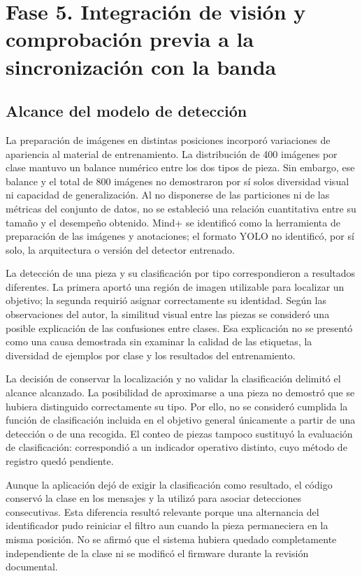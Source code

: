 \section{Fase 5. Integración de visión y comprobación previa a la sincronización con la banda}
\label{sec:discusion_fase5}

\subsection{Alcance del modelo de detección}

La preparación de imágenes en distintas posiciones incorporó variaciones de apariencia al material de entrenamiento. La distribución de 400 imágenes por clase mantuvo un balance numérico entre los dos tipos de pieza. Sin embargo, ese balance y el total de 800 imágenes no demostraron por sí solos diversidad visual ni capacidad de generalización. Al no disponerse de las particiones ni de las métricas del conjunto de datos, no se estableció una relación cuantitativa entre su tamaño y el desempeño obtenido. Mind+ se identificó como la herramienta de preparación de las imágenes y anotaciones; el formato YOLO no identificó, por sí solo, la arquitectura o versión del detector entrenado.

La detección de una pieza y su clasificación por tipo correspondieron a resultados diferentes. La primera aportó una región de imagen utilizable para localizar un objetivo; la segunda requirió asignar correctamente su identidad. Según las observaciones del autor, la similitud visual entre las piezas se consideró una posible explicación de las confusiones entre clases. Esa explicación no se presentó como una causa demostrada sin examinar la calidad de las etiquetas, la diversidad de ejemplos por clase y los resultados del entrenamiento.

La decisión de conservar la localización y no validar la clasificación delimitó el alcance alcanzado. La posibilidad de aproximarse a una pieza no demostró que se hubiera distinguido correctamente su tipo. Por ello, no se consideró cumplida la función de clasificación incluida en el objetivo general únicamente a partir de una detección o de una recogida. El conteo de piezas tampoco sustituyó la evaluación de clasificación: correspondió a un indicador operativo distinto, cuyo método de registro quedó pendiente.

Aunque la aplicación dejó de exigir la clasificación como resultado, el código conservó la clase en los mensajes y la utilizó para asociar detecciones consecutivas. Esta diferencia resultó relevante porque una alternancia del identificador pudo reiniciar el filtro aun cuando la pieza permaneciera en la misma posición. No se afirmó que el sistema hubiera quedado completamente independiente de la clase ni se modificó el firmware durante la revisión documental.

